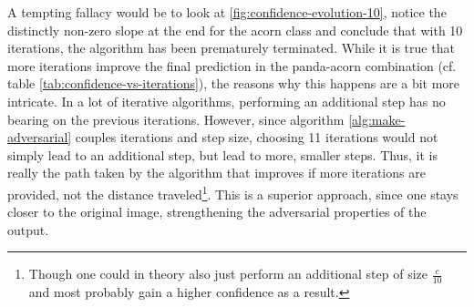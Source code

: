 \documentclass[11pt, a4paper]{article}
\begin{document}
A tempting fallacy would be to look at \ref{fig:confidence-evolution-10}, notice the distinctly non-zero slope at the end for the acorn class and conclude that with 10 iterations, the algorithm has been prematurely terminated. While it is true that more iterations improve the final prediction in the panda-acorn combination (cf. table \ref{tab:confidence-vs-iterations}), the reasons why this happens are a bit more intricate. In a lot of iterative algorithms, performing an additional step has no bearing on the previous iterations. However, since algorithm \ref{alg:make-adversarial} couples iterations and step size, choosing 11 iterations would not simply lead to an additional step, but lead to more, smaller steps. Thus, it is really the path taken by the algorithm that improves if more iterations are provided, not the distance traveled\footnote{Though one could in theory also just perform an additional step of size $\frac{c}{10}$ and most probably gain a higher confidence as a result.}. This is a superior approach, since one stays closer to the original image, strengthening the adversarial properties of the output.
















\end{document}
